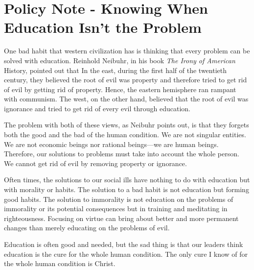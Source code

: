 \section{Policy Note - Knowing When Education Isn’t the Problem}

One bad habit that western civilization has is thinking that every
problem can be solved with education. Reinhold Neibuhr, in his book
\textit{The Irony of American }History, pointed out that In the east,
during the first half of the twentieth century, they believed the root
of evil was property and therefore tried to get rid of evil by getting
rid of property. Hence, the eastern hemisphere ran rampant with
communism. The west, on the other hand, believed that the root of evil
was ignorance and tried to get rid of every evil through education.

The problem with both of these views, as Neibuhr points out, is that
they forgets both the good and the bad of the human condition. We are
not singular entities. We are not economic beings nor rational
beings—we are human beings. Therefore, our solutions to problems must
take into account the whole person.  We cannot get rid of evil by
removing property or ignorance.

Often times, the solutions to our social ills have nothing to do with
education but with morality or habits. The solution to a bad habit is
not education but forming good habits. The solution to immorality is
not education on the problems
of immorality or its
potential consequences but in training and meditating in righteousness.
 Focusing on virtue can bring about better and more permanent changes
than merely educating on the problems of evil.

Education is often good and needed, but the sad thing is that our
leaders think education is the cure for the whole human condition. The
only cure I know of for the whole human condition is Christ.
